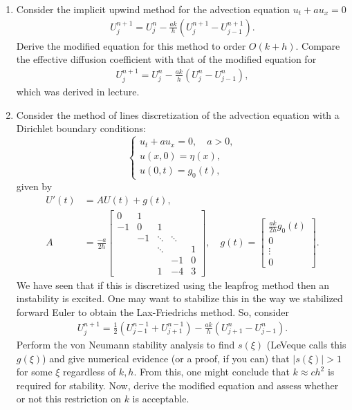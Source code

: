 \documentclass[10pt]{amsart}
\begin{document}
\mline
\begin{enumerate}[label={\bf Problem~{\arabic*}:}]
\item  Consider the implicit upwind method for the advection equation $u_t + a u_x = 0$
  \begin{align*}
    U_{j}^{n+1} = U_{j}^n  - \frac{ak}{h} \left( U_j^{n+1} - U_{j-1}^{n+1} \right).
  \end{align*}
  Derive the modified equation for this method to order $O(k + h)$.  Compare the effective diffusion coefficient with that of the modified equation for
  \begin{align*}
    U_{j}^{n+1} = U_{j}^n  - \frac{ak}{h} \left( U_j^{n} - U_{j-1}^{n} \right),
  \end{align*}
  which was derived in lecture.

  \mline
\item Consider the method of lines discretization of the advection equation with a Dirichlet boundary conditions:
  $$ \begin{cases} u_t + a u_{x} = 0, \quad a > 0,\\
u(x,0) = \eta(x),\\
u(0,t) = g_0(t), \end{cases} $$
given by
\begin{align*}
  U'(t) &= A U(t) + g(t),\\
  A &= \frac{-a}{2h} \begin{bmatrix} 0 & 1 \\
    -1 & 0 & 1 \\
    & -1 & \ddots & \ddots \\
    && \ddots && 1\\
    &&& -1 & 0 \\
    &&1 & -4 & 3
  \end{bmatrix}, \quad g(t) = \begin{bmatrix} \frac{ak}{2h} g_0(t) \\ 0 \\ \vdots \\ 0 \end{bmatrix}.
\end{align*}
We have seen that if this is discretized using the leapfrog method then an instability is excited.  One may want to stabilize this in the way we stabilized forward Euler to obtain the Lax-Friedrichs method.  So, consider
\begin{align*}
  U_j^{n+1} = \frac 1 2 ( U_{j-1}^{n-1} + U_{j+1}^{n-1}) - \frac{ak}{h} ( U_{j+1}^n - U_{j-1}^n).
\end{align*}
Perform the von Neumann stability analysis to find $s(\xi)$ (LeVeque calls this $g(\xi)$) and give numerical evidence (or a proof, if you can) that $|s(\xi)| > 1$ for some $\xi$ regardless of $k,h$.  From this, one might conclude that $k \approx c h^2$ is required for stability.  Now, derive the modified equation and assess whether or not this restriction on $k$ is acceptable.


\end{enumerate}
\end{document}
